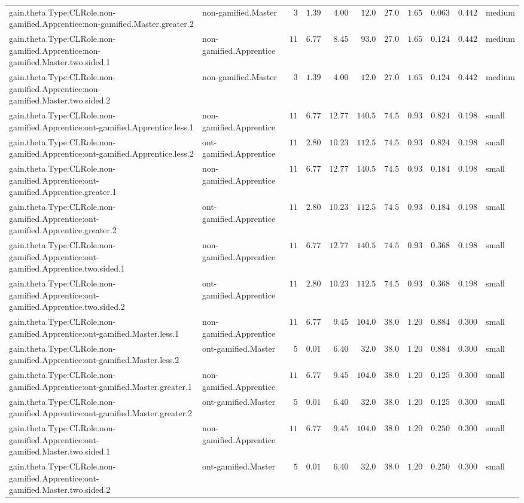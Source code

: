 \documentclass[6pt]{article}
\begin{document}
\begin{landscape}
{\begin{longtable}{llrrrrrrrrl}
gain.theta.Type:CLRole.non-gamified.Apprentice:non-gamified.Master.greater.2&non-gamified.Master&$ 3$&$1.39$&$ 4.00$&$ 12.0$&$ 27.0$&$ 1.65$&$0.063$&$0.442$&medium\tabularnewline
gain.theta.Type:CLRole.non-gamified.Apprentice:non-gamified.Master.two.sided.1&non-gamified.Apprentice&$11$&$6.77$&$ 8.45$&$ 93.0$&$ 27.0$&$ 1.65$&$0.124$&$0.442$&medium\tabularnewline
gain.theta.Type:CLRole.non-gamified.Apprentice:non-gamified.Master.two.sided.2&non-gamified.Master&$ 3$&$1.39$&$ 4.00$&$ 12.0$&$ 27.0$&$ 1.65$&$0.124$&$0.442$&medium\tabularnewline
gain.theta.Type:CLRole.non-gamified.Apprentice:ont-gamified.Apprentice.less.1&non-gamified.Apprentice&$11$&$6.77$&$12.77$&$140.5$&$ 74.5$&$ 0.93$&$0.824$&$0.198$&small\tabularnewline
gain.theta.Type:CLRole.non-gamified.Apprentice:ont-gamified.Apprentice.less.2&ont-gamified.Apprentice&$11$&$2.80$&$10.23$&$112.5$&$ 74.5$&$ 0.93$&$0.824$&$0.198$&small\tabularnewline
gain.theta.Type:CLRole.non-gamified.Apprentice:ont-gamified.Apprentice.greater.1&non-gamified.Apprentice&$11$&$6.77$&$12.77$&$140.5$&$ 74.5$&$ 0.93$&$0.184$&$0.198$&small\tabularnewline
gain.theta.Type:CLRole.non-gamified.Apprentice:ont-gamified.Apprentice.greater.2&ont-gamified.Apprentice&$11$&$2.80$&$10.23$&$112.5$&$ 74.5$&$ 0.93$&$0.184$&$0.198$&small\tabularnewline
gain.theta.Type:CLRole.non-gamified.Apprentice:ont-gamified.Apprentice.two.sided.1&non-gamified.Apprentice&$11$&$6.77$&$12.77$&$140.5$&$ 74.5$&$ 0.93$&$0.368$&$0.198$&small\tabularnewline
gain.theta.Type:CLRole.non-gamified.Apprentice:ont-gamified.Apprentice.two.sided.2&ont-gamified.Apprentice&$11$&$2.80$&$10.23$&$112.5$&$ 74.5$&$ 0.93$&$0.368$&$0.198$&small\tabularnewline
gain.theta.Type:CLRole.non-gamified.Apprentice:ont-gamified.Master.less.1&non-gamified.Apprentice&$11$&$6.77$&$ 9.45$&$104.0$&$ 38.0$&$ 1.20$&$0.884$&$0.300$&small\tabularnewline
gain.theta.Type:CLRole.non-gamified.Apprentice:ont-gamified.Master.less.2&ont-gamified.Master&$ 5$&$0.01$&$ 6.40$&$ 32.0$&$ 38.0$&$ 1.20$&$0.884$&$0.300$&small\tabularnewline
gain.theta.Type:CLRole.non-gamified.Apprentice:ont-gamified.Master.greater.1&non-gamified.Apprentice&$11$&$6.77$&$ 9.45$&$104.0$&$ 38.0$&$ 1.20$&$0.125$&$0.300$&small\tabularnewline
gain.theta.Type:CLRole.non-gamified.Apprentice:ont-gamified.Master.greater.2&ont-gamified.Master&$ 5$&$0.01$&$ 6.40$&$ 32.0$&$ 38.0$&$ 1.20$&$0.125$&$0.300$&small\tabularnewline
gain.theta.Type:CLRole.non-gamified.Apprentice:ont-gamified.Master.two.sided.1&non-gamified.Apprentice&$11$&$6.77$&$ 9.45$&$104.0$&$ 38.0$&$ 1.20$&$0.250$&$0.300$&small\tabularnewline
gain.theta.Type:CLRole.non-gamified.Apprentice:ont-gamified.Master.two.sided.2&ont-gamified.Master&$ 5$&$0.01$&$ 6.40$&$ 32.0$&$ 38.0$&$ 1.20$&$0.250$&$0.300$&small\tabularnewline

\end{longtable}}
\end{landscape}
\end{document}
